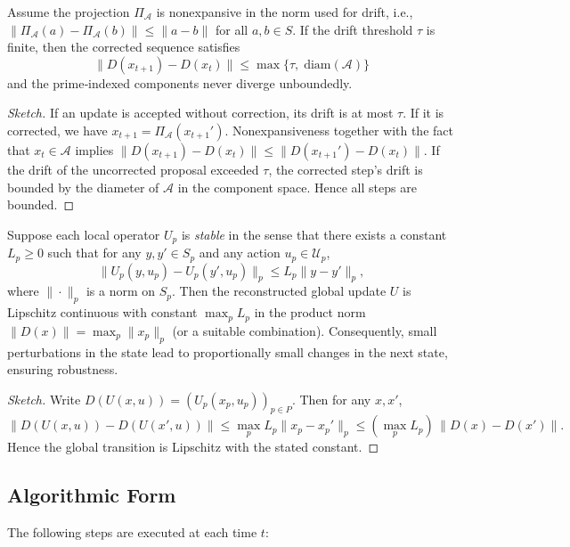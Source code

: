 \documentclass[12pt]{article}
\begin{document}
\begin{theorem}
Assume the projection \(\Pi_{\mathcal{A}}\) is nonexpansive in the norm used for drift, i.e.,
\(\|\Pi_{\mathcal{A}}(a)-\Pi_{\mathcal{A}}(b)\|\le \|a-b\|\) for all \(a,b\in S\).  
If the drift threshold \(\tau\) is finite, then the corrected sequence satisfies
\[
\|D(x_{t+1})-D(x_t)\| \le \max\{\tau,\; \text{diam}(\mathcal{A})\}
\]
and the prime‑indexed components never diverge unboundedly.
\end{theorem}
\begin{proof}[Sketch]
If an update is accepted without correction, its drift is at most \(\tau\). If it is corrected, we have \(x_{t+1}=\Pi_{\mathcal{A}}(x_{t+1}')\). Nonexpansiveness together with the fact that \(x_t\in\mathcal{A}\) implies \(\|D(x_{t+1})-D(x_t)\|\le \|D(x_{t+1}')-D(x_t)\|\). If the drift of the uncorrected proposal exceeded \(\tau\), the corrected step’s drift is bounded by the diameter of \(\mathcal{A}\) in the component space. Hence all steps are bounded. \end{proof}

\begin{theorem}
Suppose each local operator \(U_p\) is \emph{stable} in the sense that there exists a constant \(L_p\ge0\) such that for any \(y,y'\in S_p\) and any action \(u_p\in\mathcal{U}_p\),
\[
\|U_p(y,u_p)-U_p(y',u_p)\|_p \le L_p\|y-y'\|_p,
\]
where \(\|\cdot\|_p\) is a norm on \(S_p\). Then the reconstructed global update \(U\) is Lipschitz continuous with constant \(\max_p L_p\) in the product norm \(\|D(x)\| = \max_p \|x_p\|_p\) (or a suitable combination). Consequently, small perturbations in the state lead to proportionally small changes in the next state, ensuring robustness.
\end{theorem}
\begin{proof}[Sketch]
Write \(D(U(x,u)) = (U_p(x_p,u_p))_{p\in P}\). Then for any \(x,x'\),
\[
\|D(U(x,u))-D(U(x',u))\| \le \max_p L_p \|x_p-x_p'\|_p \le (\max_p L_p)\,\|D(x)-D(x')\|.
\]
Hence the global transition is Lipschitz with the stated constant. \end{proof}

\subsection{Algorithmic Form}

The following steps are executed at each time \(t\):
\end{document}
